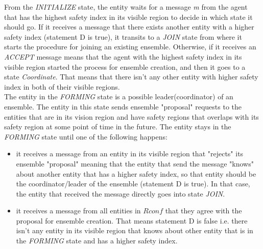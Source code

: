\documentclass[journal]{IEEEtran}
\theoremstyle{definition}
\newcommand\darko[1]{\nb{Darko}{#1}}
\begin{document}
From the \textit{INITIALIZE} state, the entity waits for a message \textit{m} from the agent that has the highest safety index in its visible region to decide in which state it should go. If it receives a message  that there exists another entity with a higher safety index (statement D is true), it transits to a \textit{JOIN} state from where it starts the procedure for joining an existing ensemble. 
Otherwise, if it receives an \textit{ACCEPT} message means that the agent with the highest safety index in its visible region started the process for ensemble creation, and then it goes to a state \textit{Coordinate}. That means that there isn't any other entity with higher safety index in both of their visible regions.\\
The entity in the \textit{FORMING} state is a possible leader(coordinator) of an ensemble. The entity in this state sends ensemble "proposal" requests to the entities that are in its vision region and have safety regions that overlaps with its safety region at some point of time in the future.
The entity stays in the \textit{FORMING} state until one of the following happens: 
\begin{itemize}
\item  it receives a message from an entity in its visible region that "rejects" its ensemble "proposal" meaning that the entity that send the message "knows" about another entity that has a higher safety index, so that entity should be the coordinator/leader of the ensemble (statement D is true). In that case, the entity that received the message directly goes into state \textit{JOIN}.
\item it receives a message from all entities in $Rconf$ 
that they agree with the proposal for ensemble creation. That means statement D is false i.e. there isn't any entity in its visible region that knows about other entity that is in the \textit{FORMING} state and has a higher safety index.
\end{itemize}
\end{document}
